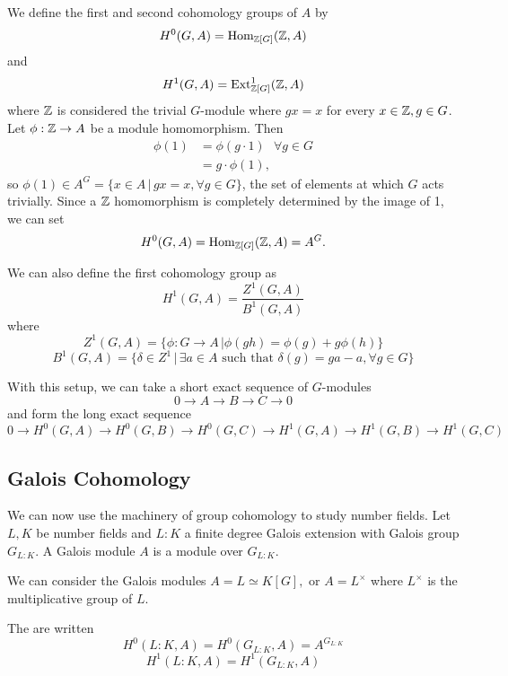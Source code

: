 \documentclass[12pt, a4paper]{amsart}
\begin{document}
We define the
first and second cohomology groups of $A$ by
\[H^0 (G, A) = \text{Hom}_{{\mathbb Z}[G]}({\mathbb Z}, A)\] and
\[H^1 (G, A) = \text{Ext}^1_{{\mathbb Z}[G]} ({\mathbb Z}, A)\]
where ${\mathbb Z}$ is considered the trivial $G$-module where $g x = x$ for every
$x \in {\mathbb Z}, g \in G$.
Let $\phi : {\mathbb Z} \rightarrow A$ be a module homomorphism. Then
\[\begin{split} \phi(1) &= \phi(g \cdot 1) \,\,\,\, \forall g \in G \\
    &= g \cdot \phi(1) , \end{split}\]
so $\phi(1) \in A^G = \{x \in A \, | \, gx = x, \forall g \in G\}$, the set
of elements at which $G$ acts trivially. Since a ${\mathbb Z}$ homomorphism is
completely determined by the image of 1, we can set
\[ H^0 (G, A) = \text{Hom}_{{\mathbb Z}[G]}({\mathbb Z}, A) = A^G .\] 

We can also define the first cohomology group as
\[H^1(G, A) = \frac{Z^1(G,A)}{B^1(G,A)}\]
where
\[Z^1(G,A) = \{ \phi : G \rightarrow A \, | \phi(gh) = \phi(g) + g \phi(h)\}\]
\[B^1(G,A) = \{ \delta \in Z^1 \, | \, \exists a \in A \,\,\text{such that}\,\, \delta(g)
  = ga - a , \forall g \in G\}\]

\begin{prop}
  With this setup, we can take a short exact sequence of $G$-modules
  \[ 0 \rightarrow A \rightarrow B \rightarrow C \rightarrow 0\]
  and form the long exact sequence
  \[ 0 \rightarrow H^0(G, A) \rightarrow H^0(G,B) \rightarrow H^0(G,C)
    \rightarrow H^1(G, A) \rightarrow H^1(G,B) \rightarrow H^1(G,C) \]
\end{prop}

\subsection{Galois Cohomology}

We can now use the machinery of group cohomology to study number fields.
Let $L, K$ be number fields and $L : K$ a finite degree Galois
extension with Galois group $G_{L:K}$.
A Galois module $A$ is a module over $G_{L:K}$.

\begin{example}
  We can consider the Galois modules $A = L \simeq K[G], $ or $A =
  L^{\times}$ where $L^{\times}$ is the multiplicative group of $L$.
\end{example}


\begin{defn}
  The  are written
        \[H^0(L:K, A) = H^0(G_{L:K}, A) = A^{G_{L:K}} \]
        \[H^1(L:K, A) = H^1(G_{L:K}, A) \]
\end{defn}
\end{document}
